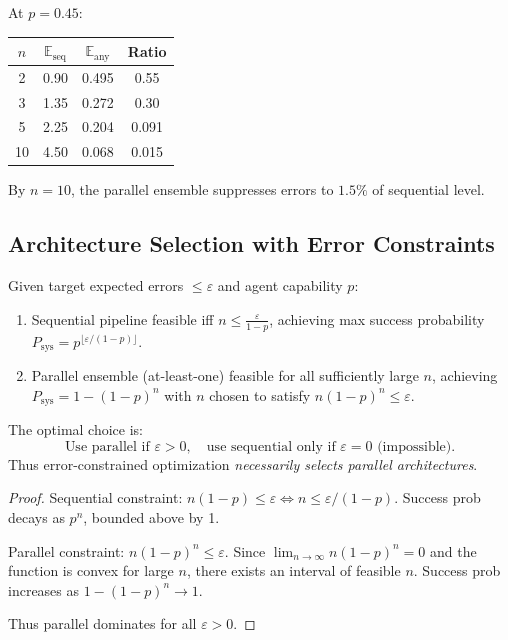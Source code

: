 \begin{example}
At $p = 0.45$:
\begin{center}
\begin{tabular}{c|c|c|c}
$n$ & $\mathbb{E}_{\mathrm{seq}}$ & $\mathbb{E}_{\mathrm{any}}$ & Ratio \\
\hline
2 & 0.90 & 0.495 & 0.55 \\
3 & 1.35 & 0.272 & 0.30 \\
5 & 2.25 & 0.204 & 0.091 \\
10 & 4.50 & 0.068 & 0.015 \\
\end{tabular}
\end{center}
By $n = 10$, the parallel ensemble suppresses errors to $1.5\%$ of sequential level.
\end{example}

\subsection{Architecture Selection with Error Constraints}

\begin{theorem}
\label{thm:error-constrained-architecture}
Given target expected errors $\le \varepsilon$ and agent capability $p$:
\begin{enumerate}
  \item Sequential pipeline feasible iff $n \le \frac{\varepsilon}{1-p}$, achieving max success
    probability $P_{\mathrm{sys}} = p^{\lfloor \varepsilon/(1-p) \rfloor}$.
  \item Parallel ensemble (at-least-one) feasible for all sufficiently large $n$, achieving
    $P_{\mathrm{sys}} = 1 - (1-p)^n$ with $n$ chosen to satisfy $n(1-p)^n \le \varepsilon$.
\end{enumerate}

The optimal choice is:
\[
  \text{Use parallel if } \varepsilon > 0, \quad \text{use sequential only if } \varepsilon = 0 \text{ (impossible)}.
\]
Thus error-constrained optimization \emph{necessarily selects parallel architectures}.
\end{theorem}

\begin{proof}
Sequential constraint: $n(1-p) \le \varepsilon \iff n \le \varepsilon/(1-p)$. Success prob decays as $p^n$,
bounded above by 1.

Parallel constraint: $n(1-p)^n \le \varepsilon$. Since $\lim_{n\to\infty} n(1-p)^n = 0$ and the function
is convex for large $n$, there exists an interval of feasible $n$. Success prob increases as $1-(1-p)^n \to 1$.

Thus parallel dominates for all $\varepsilon > 0$.
\end{proof}

